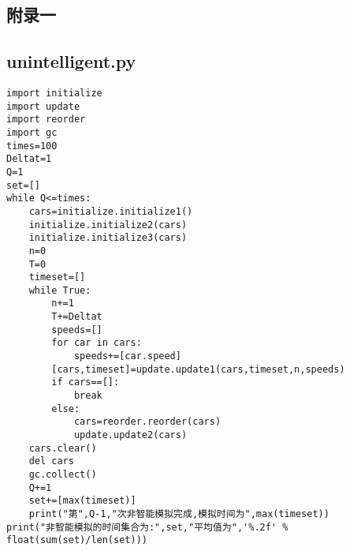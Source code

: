 \documentclass[a4paper,12pt]{article}
\numberwithin{equation}{section}
\begin{document}
\newpage
	\begin{appendix}
	\section{附录一}
	\subsection{unintelligent.py}
	\begin{lstlisting}
import initialize
import update
import reorder
import gc
times=100
Deltat=1
Q=1
set=[]
while Q<=times:
    cars=initialize.initialize1()
    initialize.initialize2(cars)
    initialize.initialize3(cars)
    n=0
    T=0
    timeset=[]
    while True:
        n+=1
        T+=Deltat
        speeds=[]
        for car in cars:
            speeds+=[car.speed]
        [cars,timeset]=update.update1(cars,timeset,n,speeds)
        if cars==[]:
            break
        else:
            cars=reorder.reorder(cars)
            update.update2(cars) 
    cars.clear()
    del cars
    gc.collect()
    Q+=1
    set+=[max(timeset)]
    print("第",Q-1,"次非智能模拟完成,模拟时间为",max(timeset))
print("非智能模拟的时间集合为:",set,"平均值为",'%.2f' % float(sum(set)/len(set)))
	\end{lstlisting}

\end{appendix}
\end{document}

